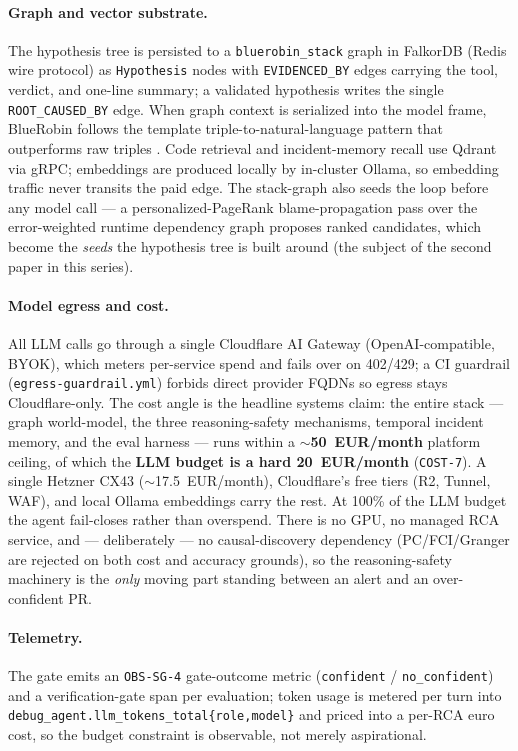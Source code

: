\documentclass[11pt]{article}
\begin{document}
\paragraph{Graph and vector substrate.}
The hypothesis tree is persisted to a \texttt{bluerobin\_stack} graph in
FalkorDB (Redis wire protocol) as \texttt{Hypothesis} nodes with
\texttt{EVIDENCED\_BY} edges carrying the tool, verdict, and one-line summary;
a validated hypothesis writes the single \texttt{ROOT\_CAUSED\_BY} edge. When
graph context is serialized into the model frame, BlueRobin follows the
template triple-to-natural-language pattern that outperforms raw triples
\citep{simpleiseffective2024}. Code
retrieval and incident-memory recall use Qdrant via gRPC; embeddings are
produced locally by in-cluster Ollama, so embedding traffic never transits the
paid edge. The stack-graph also seeds the loop before any model call --- a
personalized-PageRank blame-propagation pass over the error-weighted runtime
dependency graph proposes ranked candidates, which become the \emph{seeds} the
hypothesis tree is built around (the subject of the second paper in this
series).

\paragraph{Model egress and cost.}
All LLM calls go through a single Cloudflare AI Gateway (OpenAI-compatible,
BYOK), which meters per-service spend and fails over on 402/429; a CI
guardrail (\texttt{egress-guardrail.yml}) forbids direct provider FQDNs so
egress stays Cloudflare-only. The cost angle is the headline systems claim:
the entire stack --- graph world-model, the three reasoning-safety mechanisms,
temporal incident memory, and the eval harness --- runs within a
\textbf{$\sim$50~EUR/month} platform ceiling, of which the \textbf{LLM budget
is a hard 20~EUR/month} (\texttt{COST-7}). A single Hetzner CX43
($\sim$17.5~EUR/month), Cloudflare's free tiers (R2, Tunnel, WAF), and local
Ollama embeddings carry the rest. At 100\% of the LLM budget the agent
fail-closes rather than overspend. There is no GPU, no managed RCA service,
and --- deliberately --- no causal-discovery dependency (PC/FCI/Granger are
rejected on both cost and accuracy grounds), so the reasoning-safety machinery
is the \emph{only} moving part standing between an alert and an over-confident
PR.

\paragraph{Telemetry.}
The gate emits an \texttt{OBS-SG-4} gate-outcome metric
(\texttt{confident} / \texttt{no\_confident}) and a verification-gate span per
evaluation; token usage is metered per turn into
\texttt{debug\_agent.llm\_tokens\_total\{role,model\}} and priced into a
per-RCA euro cost, so the budget constraint is observable, not merely
aspirational.
\end{document}
